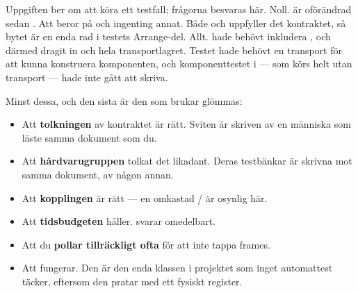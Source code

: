 Uppgiften ber om att köra ett testfall; frågorna besvaras här.
 Noll.  är oförändrad sedan .
 Att  beror på  och ingenting annat. Både
 och  uppfyller det kontraktet, så bytet är en enda rad i testets
Arrange-del.
 Allt.  hade behövt inkludera , och därmed dragit in
 och hela transportlagret. Testet hade behövt en transport för att kunna
konstruera komponenten, och komponenttestet i  --- som körs helt utan
transport --- hade inte gått att skriva.

Minst dessa, och den sista är den som brukar glömmas:

\begin{itemize}
  \item Att \textbf{tolkningen} av kontraktet är rätt. Sviten är skriven av en människa som läste
    samma dokument som du.
  \item Att \textbf{hårdvarugruppen} tolkat det likadant. Deras testbänkar är skrivna mot samma
    dokument, av någon annan.
  \item Att \textbf{kopplingen} är rätt --- en omkastad / är osynlig här.
  \item Att \textbf{tidsbudgeten} håller.  svarar omedelbart.
  \item Att du \textbf{pollar tillräckligt ofta} för att inte tappa frames.
  \item Att  fungerar. Den är den enda klassen i projektet som inget
    automattest täcker, eftersom den pratar med ett fysiskt register.
\end{itemize}
